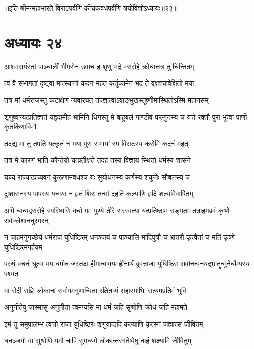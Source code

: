 ॥इति श्रीमन्महाभारते विराटपर्वणि कीचकवधपर्वणि त्रयोविंशोऽध्यायः॥२३॥

\chapter{अध्यायः २४}

\twolineshloka
{आश्वासयंस्तां पाञ्चालीं भीमसेन उवाच ह}
{शृणु भद्रे वरारोहे क्रोधात्तत्र तु चिन्तितम्}


\twolineshloka
{त्वं वै सभागतां दृष्ट्वा मात्स्यानां कदनं महत्}
{कर्तुकामेन भद्रं ते वृक्षश्चावेक्षितो मया}


\twolineshloka
{तत्र मां धर्मराजस्तु कटाक्षेण न्यवारयत्}
{तज्ज्ञात्वाऽवाङ्भुखस्तूष्णीमास्थितोऽस्मि महानसम्}


\threelineshloka
{शृणुष्वान्यत्प्रतिज्ञातं यद्वदामीह भामिनि}
{धिगस्तु मे बाहुबलं गाण्डीवं फल्गुनस्य च}
{यत्ते रक्तौ पुरा भूत्वा पाणी कृतकिणाविमौ}


\twolineshloka
{तदद्य मां तु तपति यत्कृतं न मया पुरा}
{सभायां स्म विराटस्य करोमि कदनं महत्}


\twolineshloka
{तत्र मे कारणं भाति कौन्तेयो यत्प्रतीक्षते}
{तदहं तस्य विज्ञाय स्थितो धर्मस्य शासने}


\twolineshloka
{यच्च राज्यात्प्रच्यवनं कुरूणामवधश्च यः}
{सुयोधनस्य कर्णस्य शकुनेः सौबलस्य च}


\twolineshloka
{दुःशासनस्य पापस्य यन्मया न हृतं शिरः}
{तन्मां दहति कल्याणि हृदि शल्यमिवार्पितम्}


\threelineshloka
{अपि चान्यद्वरारोहे स्मरिष्यसि वचो मम}
{पुण्ये तीरे सरस्वत्या यत्प्रतिष्ठाम सङ्गताः}
{तत्राहमब्रवं कृष्णे सर्वक्लेशाननुस्मरन्}


\threelineshloka
{न चाहमनुगच्छेयं धर्मराजं युधिष्ठिरम्}
{धनञ्जयं च पाञ्चालि माद्रिपुत्रौ च भ्रातरौ}
{कृत्वैतां च मतिं कृष्णे युधिष्ठिरमगर्हयम्}


\threelineshloka
{परुषं वचनं श्रुत्वा मम धर्मात्मजस्तदा}
{हीमान्वाक्यमहीनार्थं ब्रुवन्राजा युधिष्ठिरः}
{सर्वानन्वनयद्भ्रातॄन्मुनेर्धौम्यस्य पश्यतः}


\twolineshloka
{मा रोदी राज्ञि लोकानां सर्वागमगुणान्विता}
{रक्षितव्यं सहास्माभिः सत्यमप्रतिमं भुवि}


\twolineshloka
{अनुनीतेषु चास्मासु अनुनीता त्वमप्यसि}
{मा धर्मं जहि सुश्रोणि क्रोधं जहि महामते}


\twolineshloka
{इमं तु समुपालम्भं त्वत्तो राजा युधिष्ठिरः}
{शृणुयाद्यदि कल्याणि कृत्स्नं जह्यात्स जीवितम्}


\twolineshloka
{धनञ्जयो वा सुश्रोणि यमौ चापि सुमध्यमे}
{लोकान्तरगतेष्वेषु नाहं शक्ष्यामि जीवितुम्}



